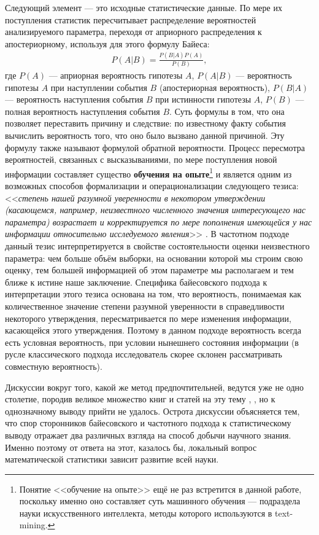 Следующий элемент --- это исходные статистические данные. По мере их поступления статистик пересчитывает распределение вероятностей анализируемого параметра, переходя от априорного распределения к апостериорному, используя для этого формулу Байеса:
\begin{eqnarray}
P(A|B)=\frac{P(B|A)P(A)}{P(B)},
\end{eqnarray} где $P(A)$ --- априорная вероятность гипотезы $A$, $P(A|B)$ --- вероятность гипотезы $A$ при наступлении события $B$ (апостериорная вероятность), $P(B|A)$ --- вероятность наступления события $B$ при истинности гипотезы $A$, $P(B)$ --- полная вероятность наступления события $B$. Суть формулы в том, что она позволяет переставить причину и следствие: по известному факту события вычислить вероятность того, что оно было вызвано данной причиной. Эту формулу также называют формулой обратной вероятности. Процесс пересмотра вероятностей, связанных с высказываниями, по мере поступления новой информации составляет существо \textbf{обучения на опыте}\footnote{Понятие <<обучение на опыте>> ещё не раз встретится в данной работе, поскольку именно оно составляет суть машинного обучения --- подраздела науки искусственного интеллекта, методы которого используются в text-mining.} \cite[стр. 21-22]{Zellner1980} и  является одним из возможных способов формализации и операционализации следующего тезиса: <<\textit{степень нашей разумной уверенности в некотором утверждении (касающемся, например, неизвестного численного значения интересующего нас параметра) возрастает и корректируется по мере пополнения имеющейся у нас информации относительно исследуемого явления}>> \cite[стр. 93]{Aivazyan2008}. В частотном подходе данный тезис интерпретируется в свойстве состоятельности оценки неизвестного параметра: чем больше объём выборки, на основании которой мы строим свою оценку, тем большей информацией об этом параметре мы располагаем и тем ближе к истине наше заключение. Специфика байесовского подхода к интерпретации этого тезиса основана на том, что вероятность, понимаемая как количественное значение степени разумной уверенности в справедливости некоторого утверждения, пересматривается по мере изменения информации, касающейся этого утверждения. Поэтому в данном подходе вероятность всегда есть условная вероятность, при условии нынешнего состояния информации (в русле классического подхода исследователь скорее склонен рассматривать совместную вероятность\cite[стр. 5]{handbook_stat_dm}).

Дискуссии вокруг того, какой же метод предпочтительней, ведутся уже не одно столетие, породив великое множество книг и статей на эту тему \cite{Jeffreys1983}, \cite{Efron2005}, но к однозначному выводу прийти не удалось. Острота дискуссии объясняется тем, что спор сторонников байесовского и частотного подхода к статистическому выводу отражает два различных взгляда на способ добычи научного знания. Именно поэтому от ответа на этот, казалось бы, локальный вопрос математической статистики зависит развитие всей науки.

